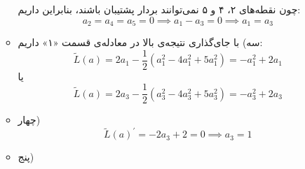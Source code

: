 \begin{itemize}
\begin{itemize}
\begin{figure}[hbpt!]
		\end{figure}
				چون نقطه‌‌های ۲، ۴ و ۵ نمی‌توانند بردار پشتیبان باشند، بنابراین داریم:
	$$
	a_2 = a_4 = a_5 = 0 \implies a_1 - a_3 = 0 \implies a_1 = a_3
	$$
		\item سه)
		با جای‌گذاری نتیجه‌ی بالا در معادله‌ی قسمت «۱» داریم:
		$$
		\tilde{L}(a) = 2a_1 - \frac{1}{2}(a_1^2 - 4a_1^2 + 5a_1^2) = -a_1^2 + 2a_1
		$$
		یا
			$$
		\tilde{L}(a) = 2a_3 - \frac{1}{2}(a_3^2 - 4a_3^2 + 5a_3^2) = -a_3^2 + 2a_3
		$$
		\item چهار)
		$$
		\tilde{L}(a)^{\prime} = -2a_3 + 2 = 0 \implies a_3 = 1
		$$
		\item پنج)
	\end{itemize}
\end{itemize}
